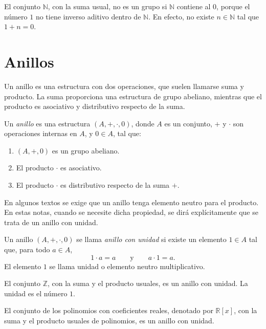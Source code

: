 \begin{contraejemplo}
El conjunto \(\mathbb{N}\), con la suma usual, no es un grupo si \(\mathbb{N}\) contiene al \(0\), porque el número \(1\) no tiene inverso aditivo dentro de \(\mathbb{N}\). En efecto, no existe \(n\in\mathbb{N}\) tal que \(1+n=0\).
\end{contraejemplo}

\section{Anillos}

Un anillo es una estructura con dos operaciones, que suelen llamarse suma y producto. La suma proporciona una estructura de grupo abeliano, mientras que el producto es asociativo y distributivo respecto de la suma.

\begin{definicion}[Anillo]
Un \emph{anillo} es una estructura \((A,+,\cdot,0)\), donde \(A\) es un conjunto, \(+\) y \(\cdot\) son operaciones internas en \(A\), y \(0\in A\), tal que:
\begin{enumerate}
  \item \((A,+,0)\) es un grupo abeliano.
  \item El producto \(\cdot\) es asociativo.
  \item El producto \(\cdot\) es distributivo respecto de la suma \(+\).
\end{enumerate}
\end{definicion}

En algunos textos se exige que un anillo tenga elemento neutro para el producto. En estas notas, cuando se necesite dicha propiedad, se dirá explícitamente que se trata de un anillo con unidad.

\begin{definicion}
Un anillo \((A,+,\cdot,0)\) se llama \emph{anillo con unidad} si existe un elemento \(1\in A\) tal que, para todo \(a\in A\),
\[
  1\cdot a=a
  \qquad\text{y}\qquad
  a\cdot 1=a.
\]
El elemento \(1\) se llama unidad o elemento neutro multiplicativo.
\end{definicion}

\begin{ejemplo}
El conjunto \(\mathbb{Z}\), con la suma y el producto usuales, es un anillo con unidad. La unidad es el número \(1\).
\end{ejemplo}

\begin{ejemplo}
El conjunto de los polinomios con coeficientes reales, denotado por \(\mathbb{R}[x]\), con la suma y el producto usuales de polinomios, es un anillo con unidad.
\end{ejemplo}

